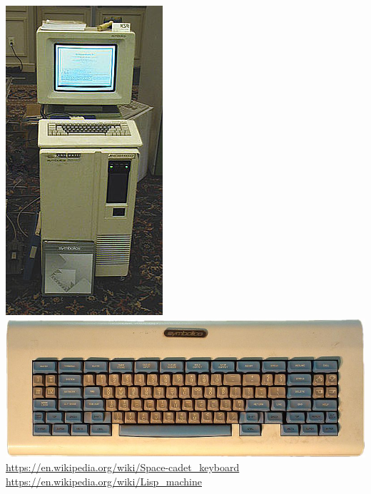 \documentclass{beamer}
\begin{document}
\begin{frame}
	\includegraphics[scale=0.15]{bilder/symblics.jpeg}
	\includegraphics[scale=0.1]{bilder/space.jpg}
	\textmd{\url{https://en.wikipedia.org/wiki/Space-cadet_keyboard} \\ \url{https://en.wikipedia.org/wiki/Lisp_machine} }	
\end{frame}
\end{document}
